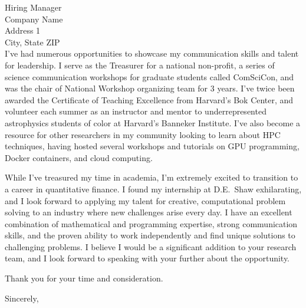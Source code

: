 \documentclass{letter}
\begin{document}
\begin{letter}{Hiring Manager\\
    Company Name\\ Address 1\\ City, State ZIP\\ }
\noindent I've had numerous opportunities to showcase my communication skills
and talent for leadership. I serve as the Treasurer for a national
non-profit, a series of science communication workshops for graduate students
called ComSciCon, and was the chair of National Workshop organizing team for 3
years. I've twice been awarded the Certificate of Teaching Excellence from
Harvard's Bok Center, and volunteer each summer as an instructor and mentor to
underrepresented astrophysics students of color at Harvard's Banneker
Institute. I've also become a resource for other researchers in my community
looking to learn about HPC techniques, having hosted several workshops and
tutorials on GPU programming, Docker containers, and cloud computing.

\noindent While I've treasured my time in academia, I'm extremely excited to
transition to a career in quantitative finance. I found my internship at
D.E.~Shaw exhilarating, and I look forward to applying my talent for creative,
computational problem solving to an industry where new challenges arise every
day. I have an excellent combination of mathematical and programming
expertise, strong communication skills, and the proven ability to work
independently and find unique solutions to challenging problems. I believe I
would be a significant addition to your research team, and I look forward to
speaking with your further about the opportunity.

Thank you for your time and consideration.

\closing{Sincerely,}

\end{letter}
\end{document}
